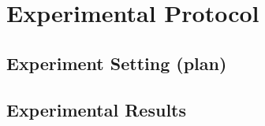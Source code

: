 \chapter{Experimental Protocol}\label{Chapter:5}


\section{Experiment Setting (plan)}
\section{Experimental Results}










